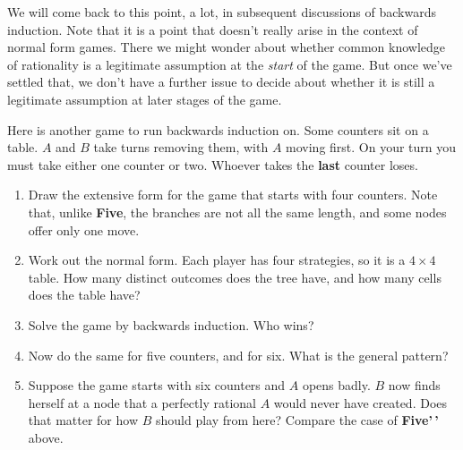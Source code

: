 \documentclass[
  11pt,
  letterpaper,
]{scrbook}
\providecommand{\tightlist}{%
  \setlength{\itemsep}{0pt}\setlength{\parskip}{0pt}}
\begin{document}
We will come back to this point, a lot, in subsequent discussions of
backwards induction. Note that it is a point that doesn't really arise
in the context of normal form games. There we might wonder about whether
common knowledge of rationality is a legitimate assumption at the
\emph{start} of the game. But once we've settled that, we don't have a
further issue to decide about whether it is still a legitimate
assumption at later stages of the game.

\begin{tcolorbox}[enhanced jigsaw, arc=.35mm, bottomrule=.15mm, bottomtitle=1mm, breakable, colback=white, colbacktitle=quarto-callout-note-color!10!white, colframe=quarto-callout-note-color-frame, coltitle=black, left=2mm, leftrule=.75mm, opacityback=0, opacitybacktitle=0.6, rightrule=.15mm, title=\textcolor{quarto-callout-note-color}{\faInfo}\hspace{0.5em}{Exercise: Last Counter}, titlerule=0mm, toprule=.15mm, toptitle=1mm]

Here is another game to run backwards induction on. Some counters sit on
a table. \(A\) and \(B\) take turns removing them, with \(A\) moving
first. On your turn you must take either one counter or two. Whoever
takes the \textbf{last} counter loses.

\begin{enumerate}
\def\labelenumi{\arabic{enumi}.}
\tightlist
\item
  Draw the extensive form for the game that starts with four counters.
  Note that, unlike \textbf{Five}, the branches are not all the same
  length, and some nodes offer only one move.
\item
  Work out the normal form. Each player has four strategies, so it is a
  \(4 \times 4\) table. How many distinct outcomes does the tree have,
  and how many cells does the table have?
\item
  Solve the game by backwards induction. Who wins?
\item
  Now do the same for five counters, and for six. What is the general
  pattern?
\item
  Suppose the game starts with six counters and \(A\) opens badly. \(B\)
  now finds herself at a node that a perfectly rational \(A\) would
  never have created. Does that matter for how \(B\) should play from
  here? Compare the case of \textbf{Five'\,'} above.
\end{enumerate}

\end{tcolorbox}
\end{document}
